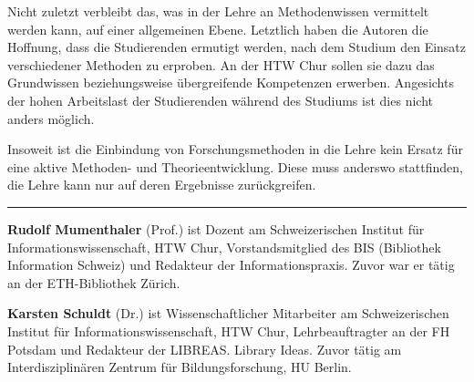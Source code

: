 \documentclass[a4paper,
fontsize=11pt,
oneside,
numbers=noperiodatend,
parskip=half-,
bibliography=totoc,
final
]{scrartcl}
\begin{document}
Nicht zuletzt verbleibt das, was in der Lehre an Methodenwissen
vermittelt werden kann, auf einer allgemeinen Ebene. Letztlich haben die
Autoren die Hoffnung, dass die Studierenden ermutigt werden, nach dem
Studium den Einsatz verschiedener Methoden zu erproben. An der HTW Chur
sollen sie dazu das Grundwissen beziehungsweise übergreifende
Kompetenzen erwerben. Angesichts der hohen Arbeitslast der Studierenden
während des Studiums ist dies nicht anders möglich.

Insoweit ist die Einbindung von Forschungsmethoden in die Lehre kein
Ersatz für eine aktive Methoden- und Theorieentwicklung. Diese muss
anderswo stattfinden, die Lehre kann nur auf deren Ergebnisse
zurückgreifen.

\begin{center}\rule{0.5\linewidth}{\linethickness}\end{center}

\textbf{Rudolf Mumenthaler} (Prof.) ist Dozent am Schweizerischen
Institut für Informationswissenschaft, HTW Chur, Vorstandsmitglied des
BIS (Bibliothek Information Schweiz) und Redakteur der
Informationspraxis. Zuvor war er tätig an der ETH-Bibliothek Zürich.

\textbf{Karsten Schuldt} (Dr.) ist Wissenschaftlicher Mitarbeiter am
Schweizerischen Institut für Informationswissenschaft, HTW Chur,
Lehrbeauftragter an der FH Potsdam und Redakteur der LIBREAS. Library
Ideas. Zuvor tätig am Interdisziplinären Zentrum für Bildungsforschung,
HU Berlin.
\end{document}
